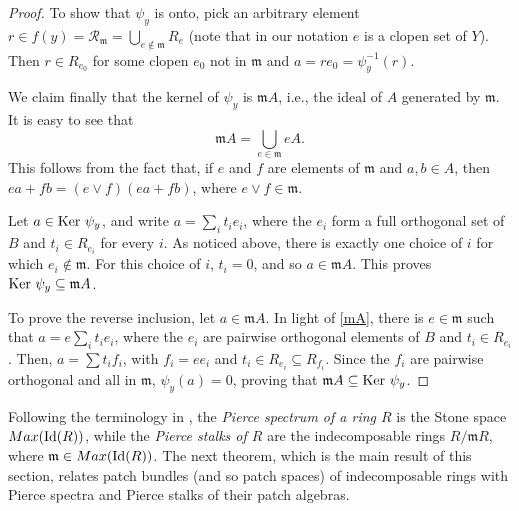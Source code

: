 \documentclass[11pt]{amsart}
\def\m{{\mathfrak m}} %
\theoremstyle{definition}
\def\ker{{\mbox{\rm{Ker} }}}
\def\Id{\mbox{\rm Id}}
\def\cal{\mathcal}
\begin{document}
\begin{proof}
To show that $\psi_y$ is onto, pick an arbitrary element $r\in f(y)={\cal R}_\m=\bigcup_{e\not \in \m} R_e$ (note that in our notation $e$ is a clopen set of $Y$). Then $r\in R_{e_0}$ for some clopen $e_0$ not in $\m$ and $a=r e_0=\psi_y^{-1}(r)$.


We claim finally that  the kernel of $\psi_y$ is $\m A$, i.e., the ideal of $A$ generated by $\m$.
It is easy to see that 
\begin{equation}\label{mA}
\m A = \bigcup_{e\in \m} eA.
\end{equation}
This follows from the fact that, if $e$ and $f$ are elements of $\m$ and $a, b\in A$, then $ea+fb=(e\vee f)(ea+fb)$, where $e\vee f \in \m$.
  

Let $a \in \ker \psi_y$, and write $a = \sum_i t_ie_i$, where the $e_i$ form a full orthogonal set of $B$ and $t_i \in R_{e_i}$ for every $i$. As noticed above, there is exactly one choice of $i$ for which $e_i \not \in \m$. For this choice of $i$, $t_i=0$, and so $a \in \m A$.  This proves $\ker \psi_y \subseteq \m A$. 

To prove the reverse inclusion, let $a \in \m A$. In light of \eqref{mA}, there is $e\in \m$ such that $a = e  \sum_i t_ie_i$, where the $e_i$ are pairwise orthogonal elements of $B$ and $t_i \in R_{e_i}$. Then, $a=\sum t_i f_i$, with $f_i=ee_i$ and $t_i\in R_{e_i}\subseteq R_{f_i}$. Since the $f_i$ are pairwise orthogonal and  all in $\m$, $\psi_y(a) =0$, proving that $\m A \subseteq \ker \psi_y$.
\end{proof} 

Following the terminology in \cite[Section 2]{BMO}, the {\it Pierce spectrum of a ring $R$} is the Stone space ${\rm Max}(\Id (R))$, while the {\it Pierce stalks of $R$} are the indecomposable rings $R/\m R$, where $\m\in {\rm Max}(\Id (R))$.  The next theorem, which is the main result of this section, relates patch bundles (and so patch spaces) of indecomposable rings with Pierce spectra and Pierce stalks of their patch algebras.
\end{document}
